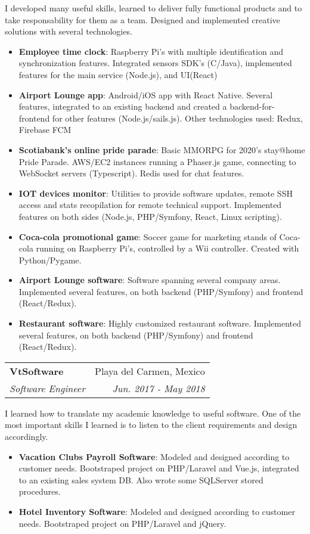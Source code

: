 \documentclass[letterpaper,11pt]{article}
\makeatletter
\newcommand{\resumeItem}[2]{
  \item\small{
    \textbf{#1}{: #2 \vspace{-2pt}}
  }
}
\newcommand{\resumeSubheading}[4]{
  \vspace{-1pt}\item
    \begin{tabular*}{0.97\textwidth}{l@{\extracolsep{\fill}}r}
      \textbf{#1} & #2 \\
      \textit{\small#3} & \textit{\small #4} \\
    \end{tabular*}\vspace{-5pt}
}
\newcommand{\resumeItemListStart}{\begin{itemize}}
\newcommand{\resumeItemListEnd}{\end{itemize}\vspace{-5pt}}
\makeatother
\begin{document}
      I developed many useful skills, learned to deliver fully functional
      products and to take responsability for them as a team. Designed and implemented
      creative solutions with several technologies.
      \resumeItemListStart
        \resumeItem{Employee time clock}
          {Raspberry Pi's with multiple identification and synchronization features. Integrated
            sensors SDK's (C/Java), implemented features for the main service
            (Node.js), and UI(React)}
        \resumeItem{Airport Lounge app}
          {Android/iOS app with React Native. Several features, integrated to an
          existing backend and created a backend-for-frontend for other features
          (Node.js/sails.js). Other technologies used: Redux, Firebase FCM}
        \resumeItem{Scotiabank's online pride parade}
        {Basic MMORPG for 2020's stay@home Pride Parade. AWS/EC2 instances
          running a Phaser.js game, connecting to WebSocket servers (Typescript). Redis 
          used for chat features.}
        \resumeItem{IOT devices monitor}
          {Utilities to provide software updates, remote SSH access and stats
            recopilation for remote technical support. Implemented features on
            both sides (Node.js, PHP/Symfony, React, Linux scripting).}
        \resumeItem{Coca-cola promotional game}
          {Soccer game for marketing stands of Coca-cola running on Raspberry Pi's,
            controlled by a Wii controller. Created with Python/Pygame.}
        \resumeItem{Airport Lounge software}
          {Software spanning several company areas. Implemented several
            features, on both backend (PHP/Symfony) and frontend (React/Redux).}
        \resumeItem{Restaurant software}
          {Highly customized restaurant software. Implemented several features,
            on both backend (PHP/Symfony) and frontend (React/Redux).}
      \resumeItemListEnd

    \resumeSubheading
      {VtSoftware}{Playa del Carmen, Mexico}
      {Software Engineer}{Jun. 2017 - May 2018}
      \vspace{3pt}

      I learned how to translate my academic knowledge to useful software. One
      of the most important skills I learned is to listen to the client
      requirements and design accordingly.

      \resumeItemListStart
        \resumeItem{Vacation Clubs Payroll Software}
          {Modeled and designed according to customer needs. Bootstraped
            project on PHP/Laravel and Vue.js, integrated to an existing sales
            system DB. Also wrote some SQLServer stored procedures.}
        \resumeItem{Hotel Inventory Software}
          {Modeled and designed according to customer needs. Bootstraped project
          on PHP/Laravel and jQuery.}
      \resumeItemListEnd
\end{document}
